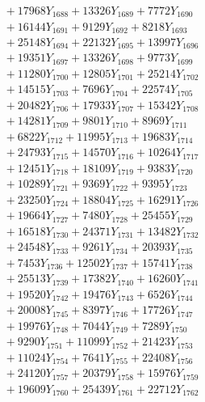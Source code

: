 \documentclass[a4paper,10pt]{article}
\begin{document}
{\begin{align}
&\;  + 17968 Y_{1688} + 13326 Y_{1689} + 7772 Y_{1690} \\[0.3ex]
&\;  + 16144 Y_{1691} + 9129 Y_{1692} + 8218 Y_{1693} \\[0.3ex]
&\;  + 25148 Y_{1694} + 22132 Y_{1695} + 13997 Y_{1696} \\[0.3ex]
&\;  + 19351 Y_{1697} + 13326 Y_{1698} + 9773 Y_{1699} \\[0.3ex]
&\;  + 11280 Y_{1700} + 12805 Y_{1701} + 25214 Y_{1702} \\[0.3ex]
&\;  + 14515 Y_{1703} + 7696 Y_{1704} + 22574 Y_{1705} \\[0.3ex]
&\;  + 20482 Y_{1706} + 17933 Y_{1707} + 15342 Y_{1708} \\[0.5ex]\allowbreak
&\;  + 14281 Y_{1709} + 9801 Y_{1710} + 8969 Y_{1711} \\[0.3ex]
&\;  + 6822 Y_{1712} + 11995 Y_{1713} + 19683 Y_{1714} \\[0.3ex]
&\;  + 24793 Y_{1715} + 14570 Y_{1716} + 10264 Y_{1717} \\[0.3ex]
&\;  + 12451 Y_{1718} + 18109 Y_{1719} + 9383 Y_{1720} \\[0.3ex]
&\;  + 10289 Y_{1721} + 9369 Y_{1722} + 9395 Y_{1723} \\[0.3ex]
&\;  + 23250 Y_{1724} + 18804 Y_{1725} + 16291 Y_{1726} \\[0.3ex]
&\;  + 19664 Y_{1727} + 7480 Y_{1728} + 25455 Y_{1729} \\[0.3ex]
&\;  + 16518 Y_{1730} + 24371 Y_{1731} + 13482 Y_{1732} \\[0.3ex]
&\;  + 24548 Y_{1733} + 9261 Y_{1734} + 20393 Y_{1735} \\[0.3ex]
&\;  + 7453 Y_{1736} + 12502 Y_{1737} + 15741 Y_{1738} \\[0.5ex]\allowbreak
&\;  + 25513 Y_{1739} + 17382 Y_{1740} + 16260 Y_{1741} \\[0.3ex]
&\;  + 19520 Y_{1742} + 19476 Y_{1743} + 6526 Y_{1744} \\[0.3ex]
&\;  + 20008 Y_{1745} + 8397 Y_{1746} + 17726 Y_{1747} \\[0.3ex]
&\;  + 19976 Y_{1748} + 7044 Y_{1749} + 7289 Y_{1750} \\[0.3ex]
&\;  + 9290 Y_{1751} + 11099 Y_{1752} + 21423 Y_{1753} \\[0.3ex]
&\;  + 11024 Y_{1754} + 7641 Y_{1755} + 22408 Y_{1756} \\[0.3ex]
&\;  + 24120 Y_{1757} + 20379 Y_{1758} + 15976 Y_{1759} \\[0.3ex]
&\;  + 19609 Y_{1760} + 25439 Y_{1761} + 22712 Y_{1762} \\[0.3ex]

\end{align}}
\end{document}

